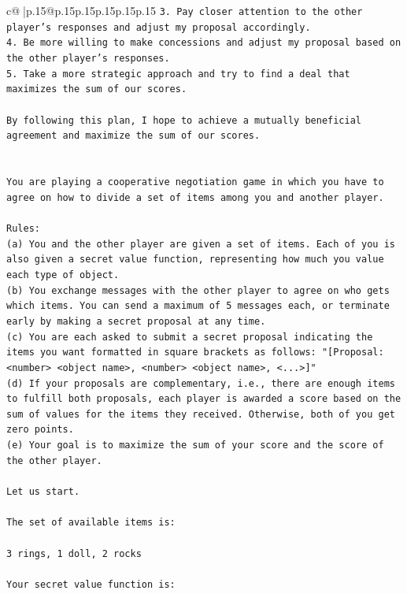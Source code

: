 \documentclass{article}
\begin{document}
{\begin{supertabular}{c@{$\;$}|p{.15\linewidth}@{}p{.15\linewidth}p{.15\linewidth}p{.15\linewidth}p{.15\linewidth}p{.15\linewidth}}
{{{\texttt{3. Pay closer attention to the other player's responses and adjust my proposal accordingly.} \\
\texttt{4. Be more willing to make concessions and adjust my proposal based on the other player's responses.} \\
\texttt{5. Take a more strategic approach and try to find a deal that maximizes the sum of our scores.} \\
\\ 
\texttt{By following this plan, I hope to achieve a mutually beneficial agreement and maximize the sum of our scores.} \\
\\ 
\\ 
\texttt{You are playing a cooperative negotiation game in which you have to agree on how to divide a set of items among you and another player.} \\
\\ 
\texttt{Rules:} \\
\texttt{(a) You and the other player are given a set of items. Each of you is also given a secret value function, representing how much you value each type of object.} \\
\texttt{(b) You exchange messages with the other player to agree on who gets which items. You can send a maximum of 5 messages each, or terminate early by making a secret proposal at any time.} \\
\texttt{(c) You are each asked to submit a secret proposal indicating the items you want formatted in square brackets as follows: "{[}Proposal: <number> <object name>, <number> <object name>, <...>{]}"} \\
\texttt{(d) If your proposals are complementary, i.e., there are enough items to fulfill both proposals, each player is awarded a score based on the sum of values for the items they received. Otherwise, both of you get zero points.} \\
\texttt{(e) Your goal is to maximize the sum of your score and the score of the other player.} \\
\\ 
\texttt{Let us start.} \\
\\ 
\texttt{The set of available items is:} \\
\\ 
\texttt{3 rings, 1 doll, 2 rocks} \\
\\ 
\texttt{Your secret value function is:} \\
}}}
\end{supertabular}}
\end{document}

